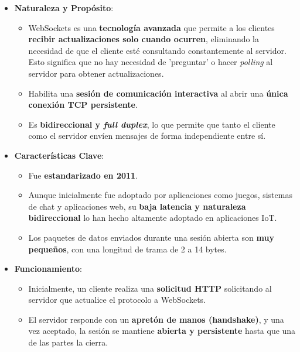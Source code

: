 \documentclass{report}
\begin{document}
\begin{itemize}
    \item \textbf{Naturaleza y Propósito}:
    \begin{itemize}
        \item WebSockets es una \textbf{tecnología avanzada} que permite a los clientes \textbf{recibir actualizaciones solo cuando ocurren}, 
        eliminando la necesidad de que el cliente esté consultando constantemente al servidor. Esto significa que no hay necesidad de  'preguntar' 
        o hacer \textit{polling} al servidor para obtener actualizaciones.
        \item Habilita una \textbf{sesión de comunicación interactiva} al abrir una \textbf{única conexión TCP persistente}.
        \item Es \textbf{bidireccional y \textit{full duplex}}, lo que permite que tanto el cliente como el servidor envíen mensajes de forma independiente 
        entre sí.
    \end{itemize}

    \item \textbf{Características Clave}:
    \begin{itemize}
        \item Fue \textbf{estandarizado en 2011}.
        \item Aunque inicialmente fue adoptado por aplicaciones como juegos, sistemas de chat y aplicaciones web, su \textbf{baja latencia y naturaleza 
        bidireccional} lo han hecho altamente adoptado en aplicaciones IoT.
        \item Los paquetes de datos enviados durante una sesión abierta son \textbf{muy pequeños}, con una longitud de trama de 2 a 14 bytes.
    \end{itemize}

    \item \textbf{Funcionamiento}:
    \begin{itemize}
        \item Inicialmente, un cliente realiza una \textbf{solicitud HTTP} solicitando al servidor que actualice el protocolo a WebSockets.
        \item El servidor responde con un \textbf{apretón de manos (handshake)}, y una vez aceptado, la sesión se mantiene \textbf{abierta y persistente} 
        hasta que una de las partes la cierra.
    \end{itemize}


\end{itemize}
\end{document}
